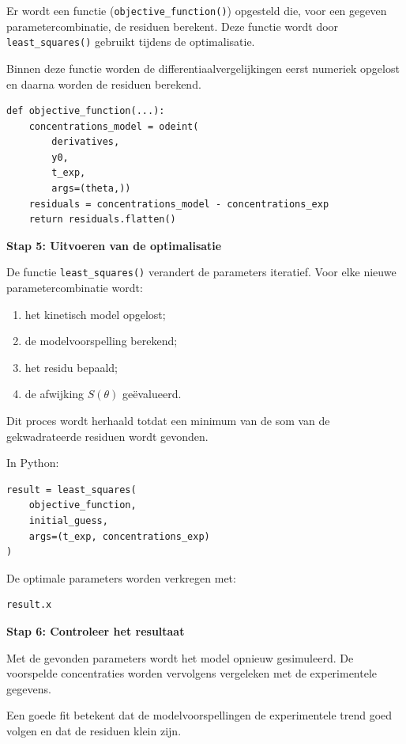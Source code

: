 \documentclass{ximera}
\begin{document}
\begin{procedure}
Er wordt een functie (\texttt{objective\_function()}) opgesteld die, voor een gegeven parametercombinatie, de residuen berekent. Deze functie wordt door \texttt{least\_squares()} gebruikt tijdens de optimalisatie.

Binnen deze functie worden de differentiaalvergelijkingen eerst numeriek opgelost en daarna worden de residuen berekend.

\begin{verbatim}
def objective_function(...):
    concentrations_model = odeint(
        derivatives,
        y0,
        t_exp,
        args=(theta,))
    residuals = concentrations_model - concentrations_exp
    return residuals.flatten()
\end{verbatim}

\bigskip

\textbf{Stap 5: Uitvoeren van de optimalisatie}

De functie \texttt{least\_squares()} verandert de parameters iteratief.
Voor elke nieuwe parametercombinatie wordt:

\begin{enumerate}
\item het kinetisch model opgelost;
\item de modelvoorspelling berekend;
\item het residu bepaald;
\item de afwijking $S(\theta)$ geëvalueerd.
\end{enumerate}

Dit proces wordt herhaald totdat een minimum van de som van de gekwadrateerde
residuen wordt gevonden.

In Python:
\begin{verbatim}
result = least_squares(
    objective_function,
    initial_guess,
    args=(t_exp, concentrations_exp)
)
\end{verbatim}

De optimale parameters worden verkregen met:
\begin{verbatim}
result.x
\end{verbatim}

\bigskip

\textbf{Stap 6: Controleer het resultaat}

Met de gevonden parameters wordt het model opnieuw gesimuleerd.
De voorspelde concentraties worden vervolgens vergeleken met de experimentele
gegevens.

Een goede fit betekent dat de modelvoorspellingen de experimentele trend goed
volgen en dat de residuen klein zijn.

\end{procedure}
\end{document}
